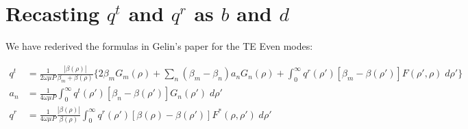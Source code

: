 \documentclass[11pt, oneside]{article}   	%
\begin{document}
\section{Recasting $q^{t}$ and $q^{r}$ as $b$ and $d$}

We have rederived the formulas in Gelin's paper for the TE Even modes:

\begin{align*}
q^{t} &= \frac{1}{2\omega \mu P} \frac{|\beta(\rho)|}{\beta_{m} + \beta(\rho)}  \bigg\{ 2 \beta_{m} G_{m}(\rho) + \sum_{n}(\beta_{m}-\beta_{n}) a_{n} G_{n}(\rho) + \int_{0}^{\infty}q^{r}(\rho')[\beta_{m} - \beta(\rho')] F(\rho',\rho) \; d\rho' \bigg\} \\
a_{n} &= \frac{1}{4 \omega\mu P} \int_{0}^{\infty} q^{t}(\rho') [\beta_{n} - \beta(\rho')] G_{n}(\rho') \; d\rho' \\
q^{r} &= \frac{1}{4\omega \mu P} \frac{|\beta(\rho)|}{\beta(\rho)}  \int_{0}^{\infty}q^{r}(\rho')[\beta(\rho) - \beta(\rho')] F^{*}(\rho,\rho') \; d\rho' 
\end{align*}
\end{document}
